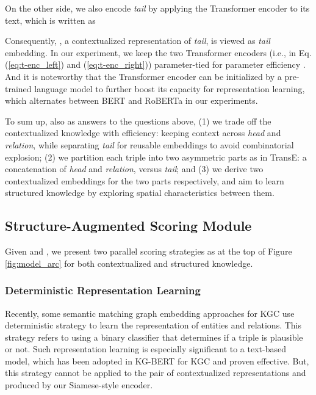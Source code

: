 \documentclass[sigconf]{acmart}
\begin{document}
On the other side, we also encode \textit{tail} by applying the Transformer encoder to its text, which is written as

Consequently, , a contextualized representation of \textit{tail}, is viewed as \textit{tail} embedding. 
In our experiment, we keep the two Transformer encoders (i.e., in Eq.(\ref{eq:t-enc_left}) and (\ref{eq:t-enc_right})) parameter-tied for parameter efficiency \cite{reimers2019sentbert}. 
And it is noteworthy that the Transformer encoder can be initialized by a pre-trained language model to further boost its capacity for representation learning, which alternates between BERT \cite{BERT} and RoBERTa \cite{RoBERTa} in our experiments.



To sum up, also as answers to the questions above, 
(1) we trade off the contextualized knowledge with efficiency: keeping context across \textit{head} and \textit{relation}, while separating \textit{tail} for reusable embeddings to avoid combinatorial explosion; 
(2) we partition each triple into two asymmetric parts as in TransE: a concatenation of \textit{head} and \textit{relation}, versus \textit{tail}; 
and (3) we derive two contextualized embeddings for the two parts respectively, and aim to learn structured knowledge by exploring spatial characteristics between them. 



\subsection{Structure-Augmented Scoring Module} \label{subsec:two_parallel_learn}

Given  and , we present two parallel scoring strategies as at the top of Figure \ref{fig:model_arc} for both contextualized and structured knowledge.

\subsubsection{Deterministic Representation Learning} \label{sec:repre_learn}

Recently, some semantic matching graph embedding approaches for KGC use deterministic strategy \cite{nguyen2017ConvKB,vu2019CapsE} to learn the representation of entities and relations. 
This strategy refers to using a binary classifier that determines if a triple is plausible or not. 
Such representation learning is especially significant to a text-based model, which has been adopted in KG-BERT for KGC and proven effective. 
But, this strategy cannot be applied to the pair of contextualized representations  and  produced by our Siamese-style encoder.
\end{document}
